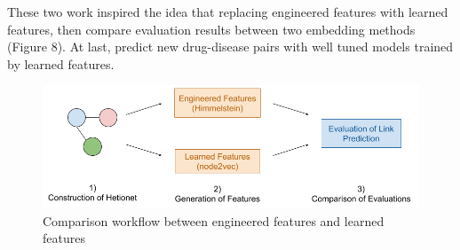 These two work inspired the idea that replacing engineered features with learned features, then compare evaluation results between two embedding methods (Figure 8). At last, predict new drug-disease pairs with well tuned models trained by learned features.

\begin{figure}[!ht]
    \centering
    \includegraphics[scale=0.4]
    {figures/workflow.png}
    \captionsetup{justification=centering}
    \caption[Comparison workflow between engineered features and learned features]{\label{fig:workflow} Comparison workflow between engineered features and learned features ~\cite{lingling_xu_comaprison_workflow.png_2019}}
\end{figure}


